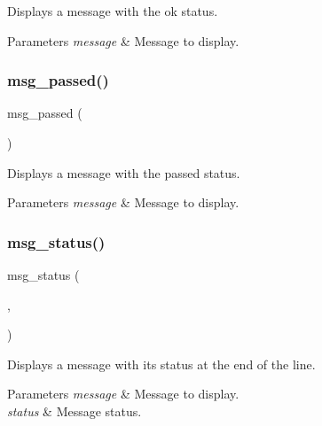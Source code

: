 Displays a message with the \textquotesingle{}ok\textquotesingle{} status. 


\begin{DoxyParams}{Parameters}
{\em message} & Message to display. \\
\hline
\end{DoxyParams}
\mbox{\label{group__message_ga9df650b1c1239ff41a66696efa81efcd}} 
\subsubsection{\texorpdfstring{msg\+\_\+passed()}{msg\_passed()}}
{\footnotesize\ttfamily msg\+\_\+passed (\begin{DoxyParamCaption}\item[{message}]{ }\end{DoxyParamCaption})}



Displays a message with the \textquotesingle{}passed\textquotesingle{} status. 


\begin{DoxyParams}{Parameters}
{\em message} & Message to display. \\
\hline
\end{DoxyParams}
\mbox{\label{group__message_gad80ab7ec02b8c2f8a2c53ff732a07db2}} 
\subsubsection{\texorpdfstring{msg\+\_\+status()}{msg\_status()}}
{\footnotesize\ttfamily msg\+\_\+status (\begin{DoxyParamCaption}\item[{message}]{,  }\item[{status}]{ }\end{DoxyParamCaption})}



Displays a message with its status at the end of the line. 


\begin{DoxyParams}{Parameters}
{\em message} & Message to display. \\
\hline
{\em status} & Message status. \\
\hline
\end{DoxyParams}
\mbox{\label{group__message_ga34a1aa638a3fb510d440f5de95a903dc}} 
